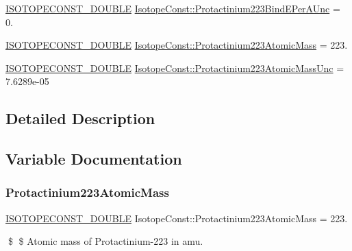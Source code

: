 \begin{DoxyCompactItemize}
\item 
\mbox{\hyperlink{group___isotope_const-_macros_ga8f45a7272ce02c0b4c65c44636ed719a}{I\+S\+O\+T\+O\+P\+E\+C\+O\+N\+S\+T\+\_\+\+D\+O\+U\+B\+LE}} \mbox{\hyperlink{group___isotope_const-_protactinium-_pa223_ga0675dcde5e9e13ca0b9f39bb0fce1aba}{Isotope\+Const\+::\+Protactinium223\+Bind\+E\+Per\+A\+Unc}} = 0.
\item 
\mbox{\hyperlink{group___isotope_const-_macros_ga8f45a7272ce02c0b4c65c44636ed719a}{I\+S\+O\+T\+O\+P\+E\+C\+O\+N\+S\+T\+\_\+\+D\+O\+U\+B\+LE}} \mbox{\hyperlink{group___isotope_const-_protactinium-_pa223_gacd85817410f84c5eb3fd8d5f3b4a4b0a}{Isotope\+Const\+::\+Protactinium223\+Atomic\+Mass}} = 223.
\item 
\mbox{\hyperlink{group___isotope_const-_macros_ga8f45a7272ce02c0b4c65c44636ed719a}{I\+S\+O\+T\+O\+P\+E\+C\+O\+N\+S\+T\+\_\+\+D\+O\+U\+B\+LE}} \mbox{\hyperlink{group___isotope_const-_protactinium-_pa223_ga7d03df99bf3b57cdaab24bc3f3ec24da}{Isotope\+Const\+::\+Protactinium223\+Atomic\+Mass\+Unc}} = 7.\+6289e-\/05
\end{DoxyCompactItemize}


\subsection{Detailed Description}


\subsection{Variable Documentation}
\mbox{\label{group___isotope_const-_protactinium-_pa223_gacd85817410f84c5eb3fd8d5f3b4a4b0a}} 
\subsubsection{\texorpdfstring{Protactinium223\+Atomic\+Mass}{Protactinium223AtomicMass}}
{\footnotesize\ttfamily \mbox{\hyperlink{group___isotope_const-_macros_ga8f45a7272ce02c0b4c65c44636ed719a}{I\+S\+O\+T\+O\+P\+E\+C\+O\+N\+S\+T\+\_\+\+D\+O\+U\+B\+LE}} Isotope\+Const\+::\+Protactinium223\+Atomic\+Mass = 223.}

\$ \$ Atomic mass of Protactinium-\/223 in amu. \mbox{\label{group___isotope_const-_protactinium-_pa223_ga7d03df99bf3b57cdaab24bc3f3ec24da}} 
